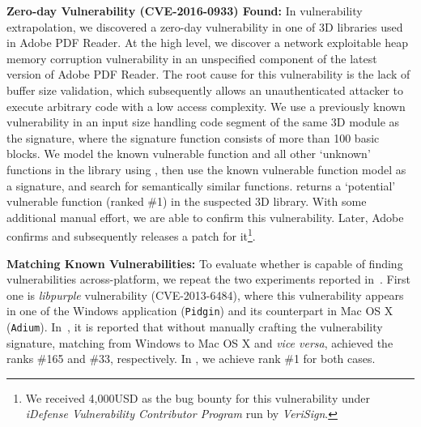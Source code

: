 \noindent \textbf{Zero-day Vulnerability (CVE-2016-0933) Found:}
In vulnerability extrapolation, we discovered a zero-day vulnerability in one of 3D libraries used in Adobe PDF Reader.
At the high level, we discover a network exploitable heap memory corruption vulnerability in an unspecified component of the latest version of Adobe PDF Reader. The root cause for this vulnerability is the lack of buffer size validation, which subsequently allows an unauthenticated attacker to execute arbitrary code with a low access complexity. We use a previously known vulnerability in an input size handling code segment of the same 3D module as the signature, where the signature function consists of more than 100 basic blocks. We model the known vulnerable function and all other `unknown' functions in the library using \tool, then use the known vulnerable function model as a signature, and search for semantically similar functions. \tool returns a `potential' vulnerable function (ranked \#1) in the suspected 3D library. With some additional manual effort, we are able to confirm this vulnerability. Later, Adobe confirms and subsequently releases a patch for it\footnote{We received 4,000USD as the bug bounty for this vulnerability  under \textit{iDefense Vulnerability Contributor Program} run by \textit{VeriSign}.}.

\noindent \textbf{Matching Known Vulnerabilities:} To evaluate whether \tool is capable of finding vulnerabilities across-platform, we repeat the two experiments reported in~\cite{DBLP:conf/sp/PewnyGGRH15}. First one is \emph{libpurple} vulnerability (CVE-2013-6484), where this vulnerability appears in one of the Windows application (\texttt{Pidgin}) and its counterpart in Mac OS X (\texttt{Adium}).   In~\cite{DBLP:conf/sp/PewnyGGRH15}, it is reported that without manually crafting the vulnerability signature, matching from Windows to Mac OS X and \emph{vice versa}, achieved the ranks \#165 and \#33, respectively. In \tool,  we achieve rank \#1 for both cases. %

